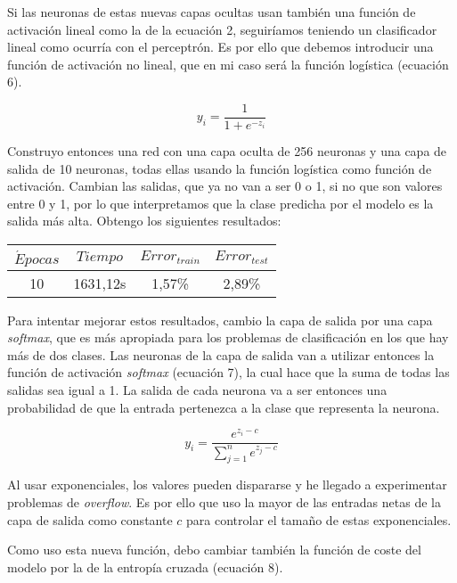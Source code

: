 Si las neuronas de estas nuevas capas ocultas usan también una función de activación lineal como la de la ecuación 2, seguiríamos teniendo un clasificador lineal como ocurría con el perceptrón. Es por ello que debemos introducir una función de activación no lineal, que en mi caso será la función logística (ecuación 6).

\begin{equation}
    y_i = \frac{1}{1 + e^{-z_i}}
\end{equation}

Construyo entonces una red con una capa oculta de 256 neuronas y una capa de salida de 10 neuronas, todas ellas usando la función logística como función de activación. Cambian las salidas, que ya no van a ser 0 o 1, si no que son valores entre 0 y 1, por lo que interpretamos que la clase predicha por el modelo es la salida más alta. Obtengo los siguientes resultados:

\begin{center}
    \begin{tabular}{ |c|c|c|c| } 
        \hline
        $\acute Epocas$ & $Tiempo$ & $Error_{train}$ & $Error_{test}$ \\
        \hline
        10       & 1631,12s &  1,57\%         & 2,89\%         \\
        \hline
    \end{tabular}
\end{center}

Para intentar mejorar estos resultados, cambio la capa de salida por una capa \textit{softmax}, que es más apropiada para los problemas de clasificación en los que hay más de dos clases. Las neuronas de la capa de salida van a utilizar entonces la función de activación \textit{softmax} (ecuación 7), la cual hace que la suma de todas las salidas sea igual a 1. La salida de cada neurona va a ser entonces una probabilidad de que la entrada pertenezca a la clase que representa la neurona.

\begin{equation}
    y_i = \frac{e^{z_i - c}}{\sum_{j=1}^n e^{z_j - c}}
\end{equation}

Al usar exponenciales, los valores pueden dispararse y he llegado a experimentar problemas de \textit{overflow}. Es por ello que uso la mayor de las entradas netas de la capa de salida como constante $c$ para controlar el tamaño de estas exponenciales.

Como uso esta nueva función, debo cambiar también la función de coste del modelo por la de la entropía cruzada (ecuación 8).

